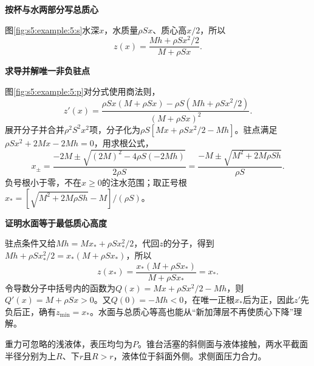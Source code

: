\begin{solution}\textbf{按杯与水两部分写总质心}\par\nobreak
图\ref{fig:s5:example:5:s}水深$x$，水质量$\rho Sx$、质心高$x/2$，所以
\[
z(x)=\frac{Mh+\rho Sx^2/2}{M+\rho Sx}.
\]



\par\medskip{}\noindent\textbf{求导并解唯一非负驻点}\par\nobreak
图\ref{fig:s5:example:5:p}对分式使用商法则，
\[
z'(x)=
\frac{\rho Sx(M+\rho Sx)-\rho S(Mh+\rho Sx^2/2)}
{(M+\rho Sx)^2}.
\]
展开分子并合并$\rho^2S^2x^2$项，分子化为$\rho S[Mx+\rho Sx^2/2-Mh]$。驻点满足$\rho Sx^2+2Mx-2Mh=0$，用求根公式，
\[
x_\pm=\frac{-2M\pm\sqrt{(2M)^2-4\rho S(-2Mh)}}{2\rho S}
=\frac{-M\pm\sqrt{M^2+2M\rho Sh}}{\rho S}.
\]
负号根小于零，不在$x\ge0$的注水范围；取正号根$x_*=[\sqrt{M^2+2M\rho Sh}-M]/(\rho S)$。


\par\medskip{}\noindent\textbf{证明水面等于最低质心高度}\par\nobreak
驻点条件又给$Mh=Mx_*+\rho Sx_*^2/2$，代回$z$的分子，得到$Mh+\rho Sx_*^2/2=x_*(M+\rho Sx_*)$，所以
\[
z(x_*)=\frac{x_*(M+\rho Sx_*)}{M+\rho Sx_*}=x_*.
\]
令导数分子中括号内的函数为$Q(x)=Mx+\rho Sx^2/2-Mh$，则$Q'(x)=M+\rho Sx>0$。又$Q(0)=-Mh<0$，在唯一正根$x_*$后为正，因此$z'$先负后正，确有$z_{\min}=x_*$。水面与总质心等高也能从“新加薄层不再使质心下降”理解。\end{solution}
\begin{question}\begin{example}[锥形活塞的均匀压力合力]\label{s5:example:6}
重力可忽略的浅液体，表压均匀为$P$。锥台活塞的斜侧面与液体接触，两水平截面半径分别为上$R$、下$r$且$R>r$，液体位于斜面外侧。求侧面压力合力。
\end{example}
\end{question}
